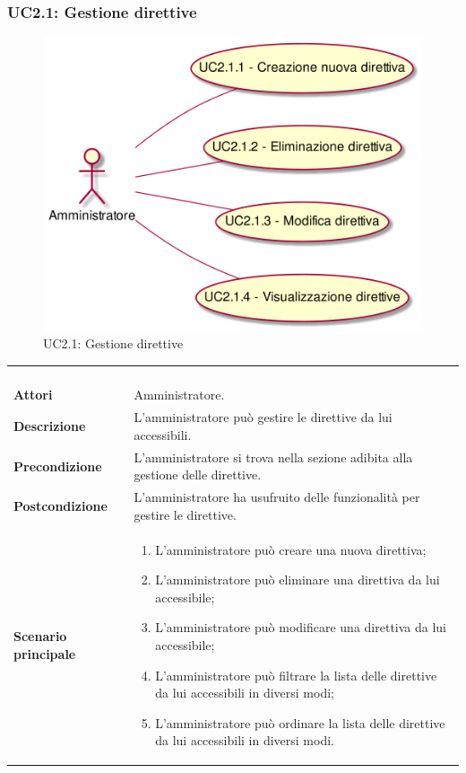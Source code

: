 \newpage\subsubsection{UC2.1: Gestione direttive}
\label{UC2.1}
\begin{figure}[h]
\centering
\includegraphics[width=\textwidth,height=\textheight,keepaspectratio]{images/UseCaseUC21.png}
\caption{UC2.1: Gestione direttive}
\end{figure}
\begin{longtable}{l|p{10cm}}
\rowcolor[gray]{0.8} \multicolumn{2}{c}{} \\
\rowcolor[gray]{0.8} \multicolumn{2}{c}{\textbf{UC2.1 - Gestione direttive}} \\
\rowcolor[gray]{0.8} \multicolumn{2}{c}{} \\
\hline
&\\
\textbf{Attori} & Amministratore.\\[7pt]
\textbf{Descrizione} & L'amministratore può gestire le direttive da lui accessibili.\\[7pt]
\textbf{Precondizione} & L'amministratore si trova nella sezione adibita alla gestione delle direttive.\\[7pt]
\textbf{Postcondizione} & L'amministratore ha usufruito delle funzionalità per gestire le direttive.\\[7pt]
\textbf{Scenario principale} &\begin{enumerate}
\item  L'amministratore può creare una nuova direttiva;
\item  L'amministratore può eliminare una direttiva da lui accessibile;
\item  L'amministratore può modificare una direttiva da lui accessibile;
\item  L'amministratore può filtrare la lista delle direttive da lui accessibili in diversi modi;
\item  L'amministratore può ordinare la lista delle direttive da lui accessibili in diversi modi.
\end{enumerate}
\\[7pt]\hline
\end{longtable}

